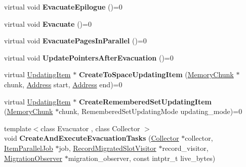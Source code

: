 \begin{DoxyCompactItemize}
virtual void {\bfseries Evacuate\+Epilogue} ()=0
\item 
\mbox{\label{classv8_1_1internal_1_1MarkCompactCollectorBase_a5345a5d1d2bfe90cfe4c39b407b2c452}} 
virtual void {\bfseries Evacuate} ()=0
\item 
\mbox{\label{classv8_1_1internal_1_1MarkCompactCollectorBase_a9d0793fbe1313eaee68ba30ce5e2a0ff}} 
virtual void {\bfseries Evacuate\+Pages\+In\+Parallel} ()=0
\item 
\mbox{\label{classv8_1_1internal_1_1MarkCompactCollectorBase_a63f2e0dc3d27d83a0b829eeb6015c575}} 
virtual void {\bfseries Update\+Pointers\+After\+Evacuation} ()=0
\item 
\mbox{\label{classv8_1_1internal_1_1MarkCompactCollectorBase_ab4212e9a493b8275a676c91b9b26b42f}} 
virtual \mbox{\hyperlink{classv8_1_1internal_1_1UpdatingItem}{Updating\+Item}} $\ast$ {\bfseries Create\+To\+Space\+Updating\+Item} (\mbox{\hyperlink{classv8_1_1internal_1_1MemoryChunk}{Memory\+Chunk}} $\ast$chunk, \mbox{\hyperlink{classuintptr__t}{Address}} start, \mbox{\hyperlink{classuintptr__t}{Address}} end)=0
\item 
\mbox{\label{classv8_1_1internal_1_1MarkCompactCollectorBase_a5740324e42b040b8c30ac187a099cf6e}} 
virtual \mbox{\hyperlink{classv8_1_1internal_1_1UpdatingItem}{Updating\+Item}} $\ast$ {\bfseries Create\+Remembered\+Set\+Updating\+Item} (\mbox{\hyperlink{classv8_1_1internal_1_1MemoryChunk}{Memory\+Chunk}} $\ast$chunk, Remembered\+Set\+Updating\+Mode updating\+\_\+mode)=0
\item 
\mbox{\label{classv8_1_1internal_1_1MarkCompactCollectorBase_a732d57ec3cc1bf0ae6435ad70bd6cf29}} 
{\footnotesize template$<$class Evacuator , class Collector $>$ }\\void {\bfseries Create\+And\+Execute\+Evacuation\+Tasks} (\mbox{\hyperlink{classv8_1_1internal_1_1Collector}{Collector}} $\ast$collector, \mbox{\hyperlink{classv8_1_1internal_1_1ItemParallelJob}{Item\+Parallel\+Job}} $\ast$job, \mbox{\hyperlink{classv8_1_1internal_1_1RecordMigratedSlotVisitor}{Record\+Migrated\+Slot\+Visitor}} $\ast$record\+\_\+visitor, \mbox{\hyperlink{classv8_1_1internal_1_1MigrationObserver}{Migration\+Observer}} $\ast$migration\+\_\+observer, const intptr\+\_\+t live\+\_\+bytes)

\end{DoxyCompactItemize}
